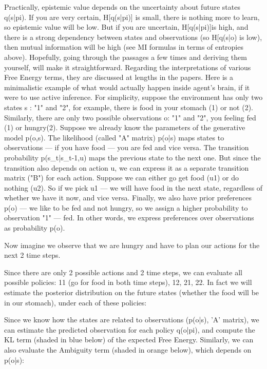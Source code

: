 \documentclass[12pt]{article}
\begin{document}
Practically, epistemic value depends on the uncertainty about future states q(s|pi). If you are very certain, H[q(s|pi)] is small, there is nothing more to learn, so epistemic value will be low. But if you are uncertain, H[q(s|pi)]is high, and there is a strong dependency between states and observations (so H[q(s|o) is low), then mutual information will be high (see MI formulas in terms of entropies above). Hopefully, going through the passages a few times and deriving them yourself, will make it straightforward. Regarding the interpretations of various Free Energy terms, they are discussed at lengths in the papers.
Here is a minimalistic example of what would actually happen inside agent's brain, if it were to use active inference. For simplicity, suppose the environment has only two states s : "1" and "2", for example, there is food in your stomach (1) or not (2). Similarly, there are only two possible observations o: "1" and "2", you feeling fed (1) or hungry(2). Suppose we already know the parameters of the generative model p(o,s). The likelihood (called "A" matrix) p(o|s) maps states to observations — if you have food — you are fed and vice versa. The transition probability p(s\_t|s\_t-1,u) maps the previous state to the next one. But since the transition also depends on action u, we can express it as a separate transition matrix ("B") for each action. Suppose we can either go get food (u1) or do nothing (u2). So if we pick u1 — we will have food in the next state, regardless of whether we have it now, and vice versa. Finally, we also have prior preferences p(o) — we like to be fed and not hungry, so we assign a higher probability to observation "1" — fed. In other words, we express preferences over observations as probability p(o).

Now imagine we observe that we are hungry and have to plan our actions for the next 2 time steps.

Since there are only 2 possible actions and 2 time steps, we can evaluate all possible policies: 11 (go for food in both time steps), 12, 21, 22. In fact we will estimate the posterior distribution on the future states (whether the food will be in our stomach), under each of these policies:

Since we know how the states are related to observations (p(o|s), 'A' matrix), we can estimate the predicted observation for each policy q(o|pi), and compute the KL term (shaded in blue below) of the expected Free Energy. Similarly, we can also evaluate the Ambiguity term (shaded in orange below), which depends on p(o|s):
\end{document}
